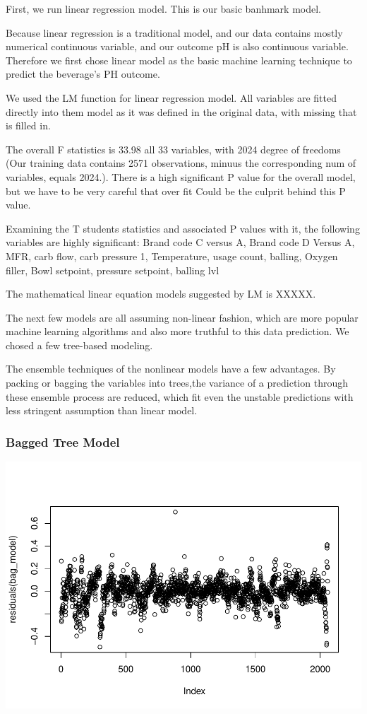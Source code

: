 \documentclass[]{article}
\begin{document}
First, we run linear regression model. This is our basic banhmark model.

Because linear regression is a traditional model, and our data contains
mostly numerical continuous variable, and our outcome pH is also
continuous variable. Therefore we first chose linear model as the basic
machine learning technique to predict the beverage's PH outcome.

We used the LM function for linear regression model. All variables are
fitted directly into them model as it was defined in the original data,
with missing that is filled in.

The overall F statistics is 33.98 all 33 variables, with 2024 degree of
freedoms (Our training data contains 2571 observations, minuus the
corresponding num of variables, equals 2024.). There is a high
significant P value for the overall model, but we have to be very
careful that over fit Could be the culprit behind this P value.

Examining the T students statistics and associated P values with it, the
following variables are highly significant: Brand code C versus A, Brand
code D Versus A, MFR, carb flow, carb pressure 1, Temperature, usage
count, balling, Oxygen filler, Bowl setpoint, pressure setpoint, balling
lvl

The mathematical linear equation models suggested by LM is XXXXX.

The next few models are all assuming non-linear fashion, which are more
popular machine learning algorithms and also more truthful to this data
prediction. We chosed a few tree-based modeling.

The ensemble techniques of the nonlinear models have a few advantages.
By packing or bagging the variables into trees,the variance of a
prediction through these ensemble process are reduced, which fit even
the unstable predictions with less stringent assumption than linear
model.

\subsubsection{Bagged Tree Model}\label{bagged-tree-model}

\begin{center}\includegraphics{OmerOzeren_GracieHan_Project_2_files/figure-latex/unnamed-chunk-18-1} \end{center}
\end{document}
